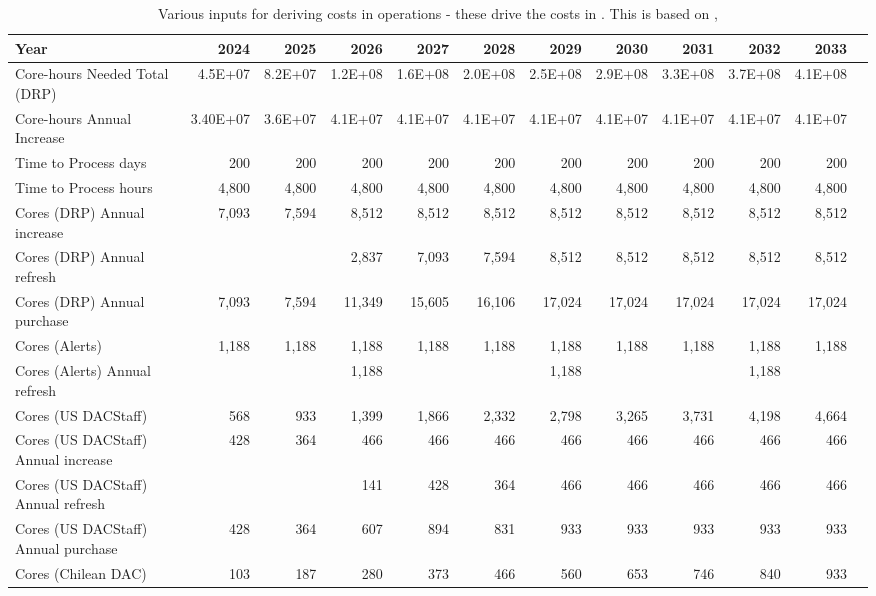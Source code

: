 \tiny \begin{longtable} { |p{}  |r  |r  |r  |r  |r  |r  |r  |r  |r  |r  |r |} 
\caption{Various inputs for deriving costs in operations - these drive the costs in . This is based on ,   \label{tab:opsInputs}}\\ 
\hline 
\textbf{Year}&\textbf{2024}&\textbf{2025}&\textbf{2026}&\textbf{2027}&\textbf{2028}&\textbf{2029}&\textbf{2030}&\textbf{2031}&\textbf{2032}&\textbf{2033} \\ \hline
{Core-hours Needed Total (DRP)}&{4.5E+07}&{8.2E+07}&{1.2E+08}&{1.6E+08}&{2.0E+08}&{2.5E+08}&{2.9E+08}&{3.3E+08}&{3.7E+08}&{4.1E+08} \\ \hline
{Core-hours Annual Increase}&{3.40E+07}&{3.6E+07}&{4.1E+07}&{4.1E+07}&{4.1E+07}&{4.1E+07}&{4.1E+07}&{4.1E+07}&{4.1E+07}&{4.1E+07} \\ \hline
{Time to Process days}&{200}&{200}&{200}&{200}&{200}&{200}&{200}&{200}&{200}&{200} \\ \hline
{Time to Process hours}&{4,800}&{4,800}&{4,800}&{4,800}&{4,800}&{4,800}&{4,800}&{4,800}&{4,800}&{4,800} \\ \hline
{Cores (DRP) Annual increase}&{7,093}&{7,594}&{8,512}&{8,512}&{8,512}&{8,512}&{8,512}&{8,512}&{8,512}&{8,512} \\ \hline
{Cores (DRP) Annual refresh}&{}&{}&{2,837}&{7,093}&{7,594}&{8,512}&{8,512}&{8,512}&{8,512}&{8,512} \\ \hline
{Cores (DRP) Annual purchase}&{7,093}&{7,594}&{11,349}&{15,605}&{16,106}&{17,024}&{17,024}&{17,024}&{17,024}&{17,024} \\ \hline
{Cores (Alerts)}&{1,188}&{1,188}&{1,188}&{1,188}&{1,188}&{1,188}&{1,188}&{1,188}&{1,188}&{1,188} \\ \hline
{Cores (Alerts) Annual refresh}&{}&{}&{1,188}&{}&{}&{1,188}&{}&{}&{1,188}& \\ \hline
{Cores (US DAC\/Staff)}&{568}&{933}&{1,399}&{1,866}&{2,332}&{2,798}&{3,265}&{3,731}&{4,198}&{4,664} \\ \hline
{Cores (US DAC\/Staff) Annual increase}&{428}&{364}&{466}&{466}&{466}&{466}&{466}&{466}&{466}&{466} \\ \hline
{Cores (US DAC\/Staff) Annual refresh}&{}&{}&{141}&{428}&{364}&{466}&{466}&{466}&{466}&{466} \\ \hline
{Cores (US DAC\/Staff) Annual purchase}&{428}&{364}&{607}&{894}&{831}&{933}&{933}&{933}&{933}&{933} \\ \hline
{Cores (Chilean DAC)}&{103}&{187}&{280}&{373}&{466}&{560}&{653}&{746}&{840}&{933} \\ \hline

\end{longtable}
